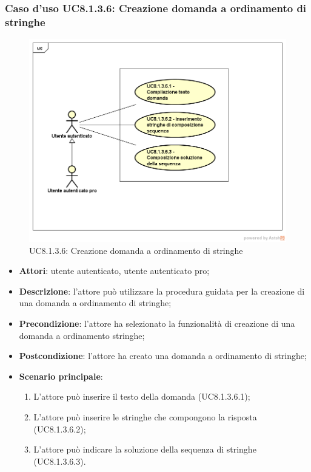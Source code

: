 \subsubsection{Caso d'uso UC8.1.3.6: Creazione domanda a ordinamento di stringhe}
	\label{UC8.1.3.6}
	\begin{figure}[h]
		\centering
			\includegraphics[scale=0.45,keepaspectratio]{UML/UC8_1_3_6.png}
		\caption{UC8.1.3.6: Creazione domanda a ordinamento di stringhe}
	\end{figure}
	\FloatBarrier
\begin{itemize}
	\item\textbf{Attori}: utente autenticato, utente autenticato pro;
	\item\textbf{Descrizione}: l'attore può utilizzare la procedura guidata per la creazione di una domanda a ordinamento di stringhe;
	\item \textbf{Precondizione}: l'attore ha selezionato la funzionalità di creazione di una domanda a ordinamento stringhe;
	\item\textbf{Postcondizione}: l'attore ha creato una domanda a ordinamento di stringhe;
	\item\textbf{Scenario principale}:
		\begin{enumerate}
			\item L'attore può inserire il testo della domanda (UC8.1.3.6.1);
			\item L'attore può inserire le stringhe che compongono la risposta (UC8.1.3.6.2);
			\item L'attore può indicare la soluzione della sequenza di stringhe (UC8.1.3.6.3).
		\end{enumerate}
\end{itemize}

